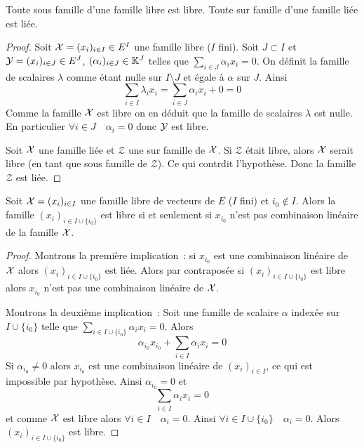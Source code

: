 \begin{prop}
  Toute sous famille d'une famille libre est libre. Toute sur famille d'une famille liée est liée.
\end{prop}
\begin{proof}
  Soit $\mathcal{X}=(x_i)_{i \in I} \in E^I$ une famille libre ($I$ fini). Soit $J \subset I$ et $\mathcal{Y}=(x_i)_{i \in J} \in E^J$, $(\alpha_i)_{i \in J} \in \mathbb{K}^J$ telles que $\sum_{i \in J} \alpha_i x_i =0$. On définit la famille de scalaires $\lambda$ comme étant nulle sur $I\setminus J$ et égale à $\alpha$ sur $J$. Ainsi
\begin{equation}
  \sum_{i \in I} \lambda_i x_i = \sum_{i \in J} \alpha_i x_i +0 =0
\end{equation}
Comme la famille $\mathcal{X}$ est libre on en déduit que la famille de scalaires $\lambda$ est nulle. En particulier $\forall i \in J \quad \alpha_i = 0$ donc $\mathcal{Y}$ est libre.

Soit $\mathcal{X}$ une famille liée et $\mathcal{Z}$ une sur famille de $\mathcal{X}$. Si $\mathcal{Z}$ était libre, alors $\mathcal{X}$ serait libre (en tant que sous famille de $\mathcal{Z}$). Ce qui contrdit l'hypothèse. Donc la famille $\mathcal{Z}$ est liée. 
\end{proof}

\begin{prop}
  Soit $\mathcal{X}=(x_i)_{i \in I}$ une famille libre de vecteurs de $E$ ($I$ fini) et $i_0 \notin I$. Alors la famille $(x_i)_{i \in I \cup \{i_0\}}$ est libre si et seulement si $x_{i_0}$ n'est pas combinaison linéaire de la famille $\mathcal{X}$.
\end{prop}
\begin{proof}
 Montrons la première implication~: si $x_{i_0}$ est une combinaison linéaire de $\mathcal{X}$ alors $(x_i)_{i \in I \cup \{i_0\}}$ est liée. Alors par contraposée si $(x_i)_{i \in I \cup \{i_0\}}$ est libre alors $x_{i_0}$ n'est pas une combinaison linéaire de $\mathcal{X}$.

  Montrons la deuxième implication~: Soit une famille de scalaire $\alpha$ indexée sur $I \cup\{i_0\}$ telle que $\sum_{i \in I \cup\{i_0\}} \alpha_i x_i =0$. Alors
  \begin{equation}
    \alpha_{i_0} x_{i_0} + \sum_{i \in I} \alpha_i x_i =0
  \end{equation}
  Si $\alpha_{i_0} \neq 0$ alors $x_{i_0}$ est une combinaison linéaire de $(x_i)_{i \in I}$, ce qui est impossible par hypothèse. Ainsi $\alpha_{i_0} = 0$ et 
  \begin{equation}
    \sum_{i \in I} \alpha_i x_i =0
  \end{equation}
  et comme $\mathcal{X}$ est libre alors $\forall i \in I \quad \alpha_i=0$. Ainsi $\forall i \in I\cup\{i_0\} \quad \alpha_i=0$. Alors $(x_i)_{i \in I \cup \{i_0\}}$ est libre.
\end{proof}


